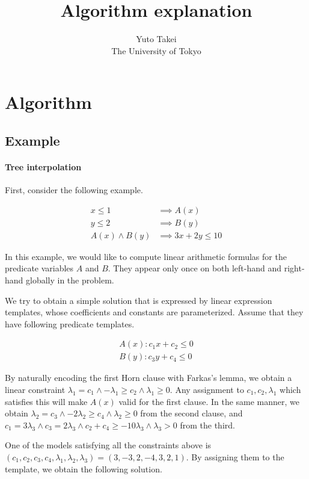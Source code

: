 \documentclass[a4paper,12pt]{article}
\title{Algorithm explanation}
\author{Yuto Takei \\ The University of Tokyo}
\begin{document}
\maketitle

\section{Algorithm}

\subsection{Example}

\paragraph {Tree interpolation}
First, consider the following example.

\begin{align*}
x \leq 1 & \implies A(x) \\
y \leq 2 & \implies B(y) \\
A(x) \wedge B(y) & \implies 3x+2y \leq 10
\end{align*}

In this example, we would like to compute linear arithmetic
formulas for the predicate variables $A$ and $B$.
They appear only once on both left-hand and right-hand globally in the problem.

We try to obtain a simple solution that is expressed by linear expression
templates, whose coefficients and constants are parameterized. Assume
that they have following predicate templates.

\begin{align*}
A(x) : c_1 x + c_2 \leq 0 \\
B(y) : c_3 y + c_4 \leq 0
\end{align*}

By naturally encoding the first Horn clause with Farkas's lemma,
we obtain a linear constraint
$ \lambda_1 = c_1 \wedge - \lambda_1 \geq c_2 \wedge \lambda_1 \geq 0 $.
Any assignment to $ c_1, c_2, \lambda_1 $ which satisfies this will make $A(x)$
valid for the first clause. In the same manner, we obtain
$ \lambda_2 = c_3 \wedge - 2 \lambda_2 \geq c_4 \wedge \lambda_2 \geq 0 $
from the second clause, and
$ c_1 = 3 \lambda_3 \wedge c_3 = 2 \lambda_3 \wedge c_2 + c_4 \geq -10 \lambda_3 \wedge \lambda_3 > 0 $
from the third.

One of the models satisfying all the constraints above is
$( c_1, c_2, c_3, c_4, \lambda_1, \lambda_2, \lambda_3 ) = (3, -3, 2, -4, 3, 2, 1)$.
By assigning them to the template, we obtain the following solution.
\end{document}
